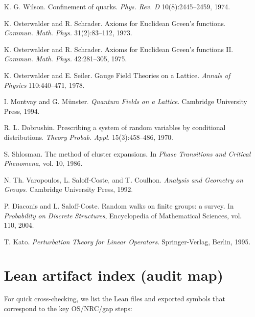 \documentclass[11pt]{amsart}
\begin{document}
\begin{thebibliography}{99}

K. G. Wilson.
Confinement of quarks.
\emph{Phys. Rev. D} 10(8):2445--2459, 1974.

K. Osterwalder and R. Schrader.
Axioms for Euclidean Green's functions.
\emph{Commun. Math. Phys.} 31(2):83--112, 1973.

K. Osterwalder and R. Schrader.
Axioms for Euclidean Green's functions II.
\emph{Commun. Math. Phys.} 42:281--305, 1975.

K. Osterwalder and E. Seiler.
Gauge Field Theories on a Lattice.
\emph{Annals of Physics} 110:440--471, 1978.

I. Montvay and G. Münster.
\emph{Quantum Fields on a Lattice}.
Cambridge University Press, 1994.

R. L. Dobrushin.
Prescribing a system of random variables by conditional distributions.
\emph{Theory Probab. Appl.} 15(3):458--486, 1970.

S. Shlosman.
The method of cluster expansions.
In \emph{Phase Transitions and Critical Phenomena}, vol. 10, 1986.

N. Th. Varopoulos, L. Saloff-Coste, and T. Coulhon.
\emph{Analysis and Geometry on Groups}.
Cambridge University Press, 1992.

P. Diaconis and L. Saloff-Coste.
Random walks on finite groups: a survey.
In \emph{Probability on Discrete Structures}, Encyclopedia of Mathematical Sciences, vol. 110, 2004.

T. Kato.
\emph{Perturbation Theory for Linear Operators}.
Springer-Verlag, Berlin, 1995.

\end{thebibliography}

\appendix

\section*{Lean artifact index (audit map)}

For quick cross-checking, we list the Lean files and exported symbols that correspond to the key OS/NRC/gap steps:
\end{document}
